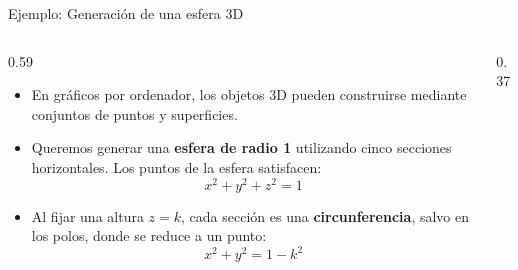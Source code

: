 \documentclass[main.tex]{subfiles}
\begin{document}
\begin{frame}{Ejemplo: Generación de una esfera 3D}
  \begin{columns}[c,onlytextwidth]
    \begin{column}{0.59\textwidth}
      \begin{itemize}
        \item En gráficos por ordenador, los objetos 3D pueden
              construirse mediante conjuntos de puntos y superficies.

        \item Queremos generar una \textbf{esfera de radio 1}
              utilizando cinco secciones horizontales.
              Los puntos de la esfera satisfacen:
              \[
                x^2+y^2+z^2=1
              \]

        \item Al fijar una altura $z=k$, cada sección es una
              \textbf{circunferencia}, salvo en los polos, donde
              se reduce a un punto:
              \[
                x^2+y^2=1-k^2
              \]
      \end{itemize}
    \end{column}
    \begin{column}{0.37\textwidth}
      \centering
    \end{column}
  \end{columns}
\end{frame}
\end{document}
